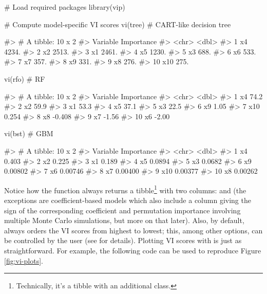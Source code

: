 \begin{Schunk}
\begin{Sinput}
# Load required packages
library(vip)

# Compute model-specific VI scores
vi(tree)  # CART-like decision tree
\end{Sinput}
\begin{Soutput}
#> # A tibble: 10 x 2
#>    Variable Importance
#>    <chr>         <dbl>
#>  1 x4            4234.
#>  2 x2            2513.
#>  3 x1            2461.
#>  4 x5            1230.
#>  5 x3             688.
#>  6 x6             533.
#>  7 x7             357.
#>  8 x9             331.
#>  9 x8             276.
#> 10 x10            275.
\end{Soutput}
\begin{Sinput}
vi(rfo)   # RF
\end{Sinput}
\begin{Soutput}
#> # A tibble: 10 x 2
#>    Variable Importance
#>    <chr>         <dbl>
#>  1 x4           74.2  
#>  2 x2           59.9  
#>  3 x1           53.3  
#>  4 x5           37.1  
#>  5 x3           22.5  
#>  6 x9            1.05 
#>  7 x10           0.254
#>  8 x8           -0.408
#>  9 x7           -1.56 
#> 10 x6           -2.00
\end{Soutput}
\begin{Sinput}
vi(bst)   # GBM
\end{Sinput}
\begin{Soutput}
#> # A tibble: 10 x 2
#>    Variable Importance
#>    <chr>         <dbl>
#>  1 x4          0.403  
#>  2 x2          0.225  
#>  3 x1          0.189  
#>  4 x5          0.0894 
#>  5 x3          0.0682 
#>  6 x9          0.00802
#>  7 x6          0.00746
#>  8 x7          0.00400
#>  9 x10         0.00377
#> 10 x8          0.00262
\end{Soutput}
\end{Schunk}

Notice how the  function always returns a
tibble\footnote{Technically, it's a tibble with an additional  class.}
with two columns:  and  (the exceptions
are coefficient-based models which also include a  column
giving the sign of the corresponding coefficient and permutation
importance involving multiple Monte Carlo simulations, but more on that
later). Also, by default,  always orders the VI scores from
highest to lowest; this, among other options, can be controlled by the
user (see  for details). Plotting VI scores with
 is just as straightforward. For example, the following code
can be used to reproduce Figure \ref{fig:vi-plots}.

